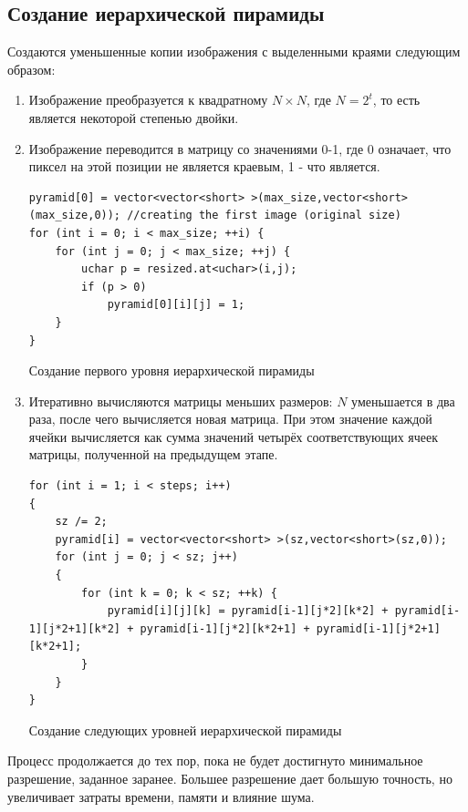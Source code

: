 \subsection{Создание иерархической пирамиды}
Создаются уменьшенные копии изображения с выделенными краями следующим образом:
\begin{enumerate}
  \item Изображение преобразуется к квадратному $N \times N$, где $N = 2^t$, то есть является некоторой степенью двойки.
  \item Изображение переводится в матрицу со значениями 0-1, где 0 означает, что пиксел на этой позиции не является краевым, 1 - что является.

\begin{ListingEnv}[H]
\begin{lstlisting}
pyramid[0] = vector<vector<short> >(max_size,vector<short>(max_size,0)); //creating the first image (original size)
for (int i = 0; i < max_size; ++i) {
    for (int j = 0; j < max_size; ++j) {
        uchar p = resized.at<uchar>(i,j);
        if (p > 0)
            pyramid[0][i][j] = 1;
    }
}
\end{lstlisting}
\caption{Создание первого уровня иерархической пирамиды}
\label{list:level0}
\end{ListingEnv}
\item Итеративно вычисляются матрицы меньших размеров: $N$ уменьшается в два раза, после чего вычисляется новая матрица. 
При этом значение каждой ячейки вычисляется как сумма значений четырёх соответствующих ячеек матрицы, полученной на предыдущем этапе.

\begin{ListingEnv}[H]
\begin{lstlisting}
for (int i = 1; i < steps; i++)
{
    sz /= 2;
    pyramid[i] = vector<vector<short> >(sz,vector<short>(sz,0));
    for (int j = 0; j < sz; j++)
    {
        for (int k = 0; k < sz; ++k) {
            pyramid[i][j][k] = pyramid[i-1][j*2][k*2] + pyramid[i-1][j*2+1][k*2] + pyramid[i-1][j*2][k*2+1] + pyramid[i-1][j*2+1][k*2+1];
        }
    }
}
\end{lstlisting}
\caption{Создание следующих уровней иерархической пирамиды}
\label{list:otherlevels}
\end{ListingEnv}

\end{enumerate}

Процесс продолжается до тех пор, пока не будет достигнуто минимальное разрешение, заданное заранее. Большее разрешение дает большую точность, но увеличивает затраты времени, памяти и влияние шума.

